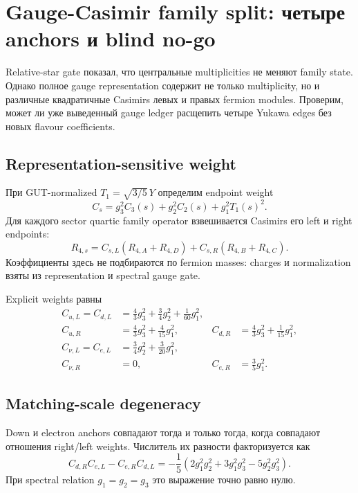 \chapter{Gauge-Casimir family split: четыре anchors и blind no-go}

Relative-star gate показал, что центральные multiplicities не меняют family
state. Однако полное gauge representation содержит не только multiplicity,
но и различные квадратичные Casimirs левых и правых fermion modules.
Проверим, может ли уже выведенный gauge ledger расщепить четыре Yukawa edges
без новых flavour coefficients.

\section{Representation-sensitive weight}

При GUT-normalized \(T_1=\sqrt{3/5}\,Y\) определим endpoint weight
\begin{equation}
 C_s=g_3^2C_3(s)+g_2^2C_2(s)+g_1^2T_1(s)^2.
\end{equation}
Для каждого sector quartic family operator взвешивается Casimirs его left и
right endpoints:
\begin{equation}
 R_{4,s}=C_{s,L}(R_{4,A}+R_{4,D})
 +C_{s,R}(R_{4,B}+R_{4,C}).
\end{equation}
Коэффициенты здесь не подбираются по fermion masses: charges и normalization
взяты из representation и spectral gauge gate.

Explicit weights равны
\begin{align}
 C_{u,L}=C_{d,L}&=\frac43g_3^2+\frac34g_2^2+\frac1{60}g_1^2,\\
 C_{u,R}&=\frac43g_3^2+\frac4{15}g_1^2,
 &C_{d,R}&=\frac43g_3^2+\frac1{15}g_1^2,\\
 C_{\nu,L}=C_{e,L}&=\frac34g_2^2+\frac3{20}g_1^2,\\
 C_{\nu,R}&=0,
 &C_{e,R}&=\frac35g_1^2.
\end{align}

\section{Matching-scale degeneracy}

Down и electron anchors совпадают тогда и только тогда, когда совпадают
отношения right/left weights. Числитель их разности факторизуется как
\begin{equation}
 C_{d,R}C_{e,L}-C_{e,R}C_{d,L}
 =-\frac15\left(
 2g_1^2g_2^2+3g_1^2g_3^2-5g_2^2g_3^2
 \right).
\end{equation}
При spectral relation \(g_1=g_2=g_3\) это выражение точно равно нулю.

